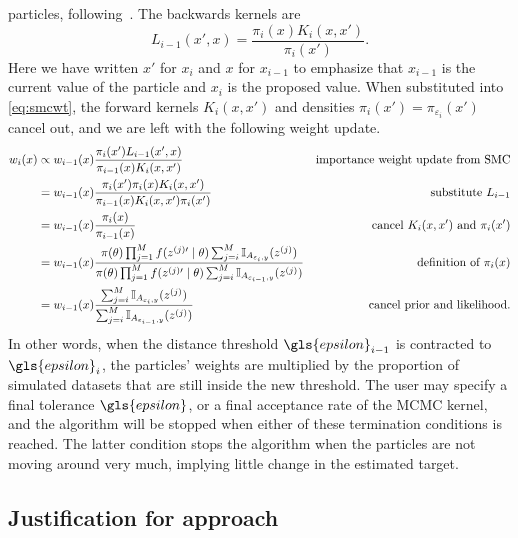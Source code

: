 particles, following~\autocite{beaumont2009adaptive, del2012adaptive}. The
backwards kernels are
\[
    L_{i-1}(x', x) = \frac{\pi_i(x)K_i(x, x')}{\pi_i(x')}.
\]
Here we have written $x'$ for $x_i$ and $x$ for $x_{i-1}$ to emphasize that
$x_{i-1}$ is the current value of the particle and $x_i$ is the proposed value.
When substituted into \cref{eq:smcwt}, the forward kernels $K_i(x, x')$ and
densities $\pi_i(x') = \pi_{\varepsilon_i}(x')$ cancel out, and we are left
with the following weight update.
\begin{align*}
    w_i(x) 
    & \propto w_{i-1}(x) \frac{\pi_i(x') L_{i-1}(x', x)}{\pi_{i-1}(x)K_i(x, x')}
        & \text{importance weight update from SMC} \\
    &=w_{i-1}(x) \frac{\pi_i(x') \pi_i(x) K_i(x, x')}{\pi_{i-1}(x)K_i(x, x')\pi_i(x')}
        & \text{substitute } L_{i-1} \\
    &= w_{i-1}(x) \frac{\pi_i(x)}{\pi_{i-1}(x)}
        & \text{cancel } K_i(x, x') \text{ and } \pi_i(x') \\
    &= w_{i-1}(x) \frac{\pi(\theta) \prod_{j=1}^M f(z^{(j)\prime} \mid \theta) 
                        \sum_{j=i}^M \mathbb{I}_{A_{\varepsilon_i, y}}(z^{(j)})}
                       {\pi(\theta) \prod_{j=1}^M f(z^{(j)\prime} \mid \theta) 
                       \sum_{j=i}^M \mathbb{I}_{A_{\varepsilon_{i-1}, y}}(z^{(j)})}
        & \text{definition of } \pi_i(x) \\
    &= w_{i-1}(x) \frac{\sum_{j=i}^M \mathbb{I}_{A_{\varepsilon_i, y}}(z^{(j)})}
        {\sum_{j=i}^M \mathbb{I}_{A_{\varepsilon_{i-1}, y}}(z^{(j)})}
        & \text{cancel prior and likelihood.}
\end{align*}
In other words, when the distance threshold $\gls{epsilon}_{i-1}$ is contracted
to $\gls{epsilon}_i$, the particles' weights are multiplied by the proportion of
simulated datasets that are still inside the new threshold. The user may
specify a final tolerance $\gls{epsilon}$, or a final acceptance rate of the
\gls{MCMC} kernel, and the algorithm will be stopped when either of these
termination conditions is reached. The latter condition stops the algorithm
when the particles are not moving around very much, implying little change in
the estimated target.

\subsection{Justification for approach}
\label{subsec:just}

